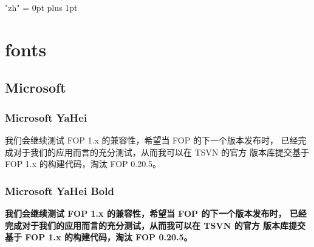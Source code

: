 \documentclass[a4paper,12pt,openany]{report}
\begin{document}
\XeTeXlinebreaklocale "zh"
\XeTeXlinebreakskip = 0pt plus 1pt

\chapter{fonts}

\section{Microsoft}
  \subsection{Microsoft YaHei}
  我们会继续测试 FOP 1.x 的兼容性，希望当 FOP 的下一个版本发布时，
  已经完成对于我们的应用而言的充分测试，从而我可以在 TSVN 的官方
  版本库提交基于 FOP 1.x 的构建代码，淘汰 FOP 0.20.5。

  \subsection{Microsoft YaHei Bold}
  {\bf 我们会继续测试 FOP 1.x 的兼容性，希望当 FOP 的下一个版本发布时，
  已经完成对于我们的应用而言的充分测试，从而我可以在 TSVN 的官方
  版本库提交基于 FOP 1.x 的构建代码，淘汰 FOP 0.20.5。}
\end{document}

